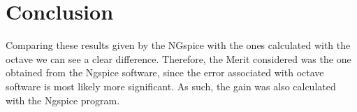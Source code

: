 \section{Conclusion}
\label{sec:conclusion}

Comparing these results given by the NGspice with the ones calculated with the octave we can see a clear difference. Therefore, the Merit considered was the one obtained from the Ngspice software, since the error associated with octave software is most likely more significant. As such, the gain was also calculated with the Ngspice program.